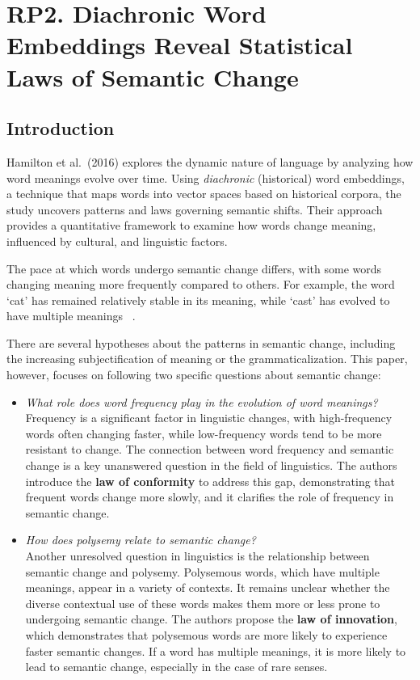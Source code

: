 
\section{RP2. Diachronic Word Embeddings Reveal Statistical Laws of Semantic Change} \label{sec:paper_hamilton}
\subsection{Introduction}\label{subsec:hamilton_introduction}
Hamilton et al.\ (2016) explores the dynamic nature of language by analyzing how word meanings evolve over time.
Using \emph{diachronic} (historical) word embeddings, a technique that maps words into vector spaces based on historical corpora, the study uncovers patterns and laws governing semantic shifts.
Their approach provides a quantitative framework to examine how words change meaning, influenced by cultural, and linguistic factors.

The pace at which words undergo semantic change differs, with some words changing meaning more frequently compared to others.
For example, the word `cat' has remained relatively stable in its meaning, while `cast' has evolved to have multiple meanings ~\cite{hamilton-etal-2016-diachronic}.

There are several hypotheses about the patterns in semantic change, including the increasing subjectification of meaning or the grammaticalization.
This paper, however, focuses on following two specific questions about semantic change:
\begin{itemize}
    \item {} \emph{What role does word frequency play in the evolution of word meanings?}\\
    Frequency is a significant factor in linguistic changes, with high-frequency words often changing faster, while low-frequency words tend to be more resistant to change.
    The connection between word frequency and semantic change is a key unanswered question in the field of linguistics.
    The authors introduce the \textbf{law of conformity} to address this gap, demonstrating that frequent words change more slowly, and it clarifies the role of frequency in semantic change.

    \item {} \emph{How does polysemy relate to semantic change?}\\
    Another unresolved question in linguistics is the relationship between semantic change and polysemy.
    Polysemous words, which have multiple meanings, appear in a variety of contexts.
    It remains unclear whether the diverse contextual use of these words makes them more or less prone to undergoing semantic change.
    The authors propose the \textbf{law of innovation}, which demonstrates that polysemous words are more likely to experience faster semantic changes.
    If a word has multiple meanings, it is more likely to lead to semantic change, especially in the case of rare senses.
\end{itemize}

